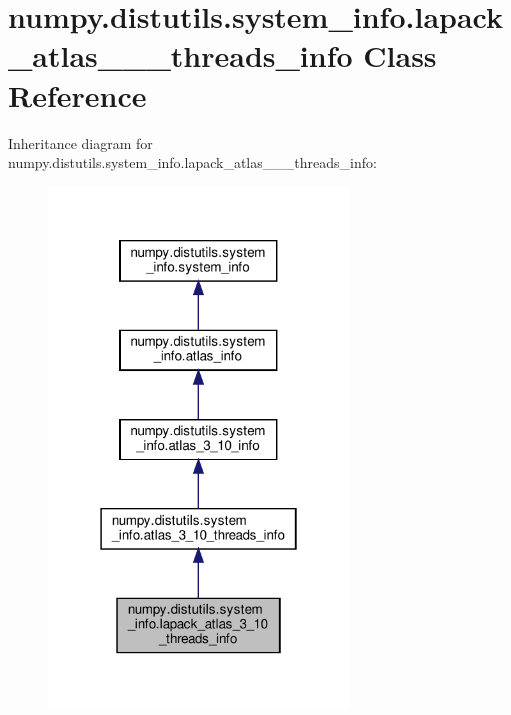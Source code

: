 \hypertarget{classnumpy_1_1distutils_1_1system__info_1_1lapack__atlas__3__10__threads__info}{}\section{numpy.\+distutils.\+system\+\_\+info.\+lapack\+\_\+atlas\+\_\+\_\+\_\+threads\+\_\+info Class Reference}
\label{classnumpy_1_1distutils_1_1system__info_1_1lapack__atlas__3__10__threads__info}


Inheritance diagram for numpy.\+distutils.\+system\+\_\+info.\+lapack\+\_\+atlas\+\_\+\_\+\_\+threads\+\_\+info\+:
\nopagebreak
\begin{figure}[H]
\begin{center}
\leavevmode
\includegraphics[width=226pt]{classnumpy_1_1distutils_1_1system__info_1_1lapack__atlas__3__10__threads__info__inherit__graph}
\end{center}
\end{figure}


